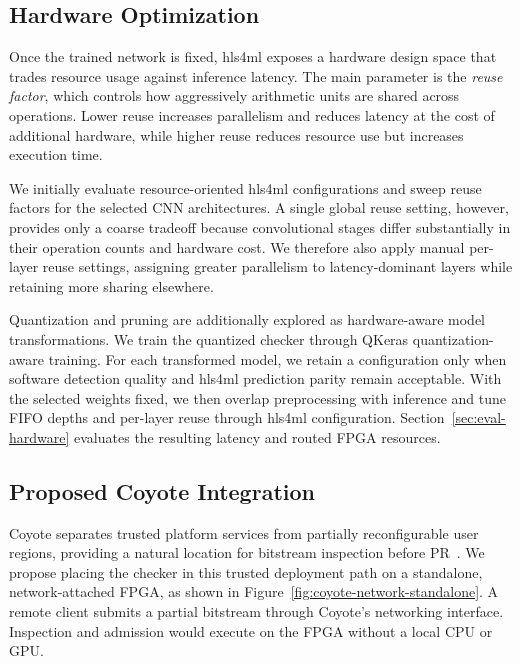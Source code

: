 \documentclass[acmsmall]{acmart}
\begin{document}
\subsection{Hardware Optimization}
\label{sec:hardware-optimization}

Once the trained network is fixed, hls4ml exposes a hardware design space that
trades resource usage against inference latency. The main parameter is the
\emph{reuse factor}, which controls how aggressively arithmetic units are shared
across operations. Lower reuse increases parallelism and reduces latency at the
cost of additional hardware, while higher reuse reduces resource use but
increases execution time.

We initially evaluate resource-oriented hls4ml configurations and sweep reuse
factors for the selected CNN architectures. A single global reuse setting,
however, provides only a coarse tradeoff because convolutional stages differ
substantially in their operation counts and hardware cost. We therefore also
apply manual per-layer reuse settings, assigning greater parallelism to
latency-dominant layers while retaining more sharing elsewhere.

Quantization and pruning are additionally explored as hardware-aware model
transformations. We train the quantized checker through QKeras quantization-aware training. For each transformed model, we retain a
configuration only when software detection quality and hls4ml prediction parity
remain acceptable. With the selected weights fixed, we then overlap
preprocessing with inference and tune FIFO depths and per-layer reuse through
hls4ml configuration. Section~\ref{sec:eval-hardware} evaluates the resulting
latency and routed FPGA resources.

\subsection{Proposed Coyote Integration}
\label{sec:coyote-integration}

Coyote separates trusted platform services from partially reconfigurable user
regions, providing a natural location for bitstream inspection before
PR~\cite{ramhorst2025coyote}. We propose placing the checker in this trusted
deployment path on a standalone, network-attached FPGA, as shown in
Figure~\ref{fig:coyote-network-standalone}. A remote client submits a partial
bitstream through Coyote's networking interface. Inspection and admission
would execute on the FPGA without a local CPU or GPU.
\end{document}

